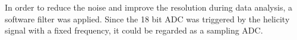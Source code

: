 \documentclass[english,review,number,sort&compress]{elsarticle}
\begin{document}
In order to reduce the noise and improve the resolution during data analysis, a software filter was applied. Since the 18 bit ADC was triggered by the helicity signal with a fixed frequency, it could be regarded as a sampling ADC. 
\begin{figure}[tbph]
\begin{centering}
\par\end{centering}

\begin{centering}
\end{centering}
\end{figure}
\end{document}

